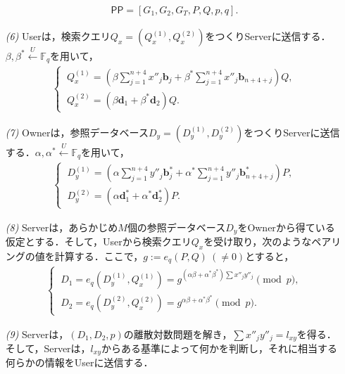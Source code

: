 \documentclass[a4paper]{jsarticle}
\newcommand{\user}{\textsf{User}}
\newcommand{\server}{\textsf{Server}}
\newcommand{\owner}{\textsf{Owner}}
\begin{document}
\begin{enumerate}
\begin{align}
\mathsf{PP} = [G_1, G_2, G_T, P, Q, p,q].
\end{align}
\item[\it{(6)}] \user は，検索クエリ$Q_x=(Q_x^{(1)}, Q_x^{(2)})$をつくり\server に送信する．$\beta, \beta^* \overset{U}{\leftarrow} \mathbb{F}_q $を用いて，
\begin{align}
\displaystyle
\begin{cases}
\ Q_x^{(1)} = \left( \beta\sum_{j = 1}^{n+4} x''_j \bm{b}_j + \beta^*\sum_{j = 1}^{n+4} x''_j \bm{b}_{n+4+j}\right) Q,\\
\ Q_x^{(2)} = \left( \beta \bm{d}_1  + \beta^* \bm{d}_2 \right) Q.
\end{cases}
\end{align}
\item[\it{(7)}] \owner は，参照データベース$D_y=(D_y^{(1)}, D_y^{(2)})$をつくり\server に送信する．$\alpha, \alpha^* \overset{U}{\leftarrow} \mathbb{F}_q $を用いて，
\begin{align}
\displaystyle
\begin{cases}
\ D_y^{(1)} = \left( \alpha\sum_{j = 1}^{n+4} y''_j \bm{b}^*_j + \alpha^*\sum_{j = 1}^{n+4} y''_j \bm{b}^*_{n+4+j}\right) P,\\
\ D_y^{(2)} = \left( \alpha \bm{d}^*_1  + \alpha^* \bm{d}^*_2 \right) P.
\end{cases}
\end{align}
\item[\it{(8)}] \server は，あらかじめ$M$個の参照データベース$D_y$を\owner から得ている仮定とする．そして，\user から検索クエリ$Q_x$を受け取り，次のようなペアリングの値を計算する．ここで，$g:=e_q(P,Q)\ (\ne 0)$とすると，
\begin{align}
\begin{cases}
\ D_1 = e_q(D_y^{(1)},Q_x^{(1)}) = g^{(\alpha\beta + \alpha^*\beta^*)\sum x''_jy''_j}\pmod{p},\\
\ D_2 = e_q(D_y^{(2)},Q_x^{(2)}) = g^{\alpha\beta + \alpha^*\beta^*}\pmod{p}.
\end{cases}
\end{align}

\item[\it{(9)}] \server は，$(D_1, D_2, p)$の離散対数問題を解き，$\sum x''_j y''_j = l_{xy}$を得る．そして，\server は，$l_{xy}$からある基準によって何かを判断し，それに相当する何らかの情報を\user に送信する．
\end{enumerate}
\end{document}

